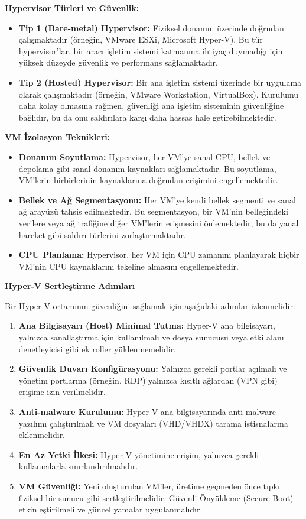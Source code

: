 \textbf{Hypervisor Türleri ve Güvenlik:}
\begin{itemize}
    \item \textbf{Tip 1 (Bare-metal) Hypervisor:} Fiziksel donanım üzerinde doğrudan çalışmaktadır (örneğin, VMware ESXi, Microsoft Hyper-V). Bu tür hypervisor'lar, bir aracı işletim sistemi katmanına ihtiyaç duymadığı için yüksek düzeyde güvenlik ve performans sağlamaktadır.
    \item \textbf{Tip 2 (Hosted) Hypervisor:} Bir ana işletim sistemi üzerinde bir uygulama olarak çalışmaktadır (örneğin, VMware Workstation, VirtualBox). Kurulumu daha kolay olmasına rağmen, güvenliği ana işletim sisteminin güvenliğine bağlıdır, bu da onu saldırılara karşı daha hassas hale getirebilmektedir.
\end{itemize}

\textbf{VM İzolasyon Teknikleri:}
\begin{itemize}
    \item \textbf{Donanım Soyutlama:} Hypervisor, her VM'ye sanal CPU, bellek ve depolama gibi sanal donanım kaynakları sağlamaktadır. Bu soyutlama, VM'lerin birbirlerinin kaynaklarına doğrudan erişimini engellemektedir.
    \item \textbf{Bellek ve Ağ Segmentasyonu:} Her VM'ye kendi bellek segmenti ve sanal ağ arayüzü tahsis edilmektedir. Bu segmentasyon, bir VM'nin belleğindeki verilere veya ağ trafiğine diğer VM'lerin erişmesini önlemektedir, bu da yanal hareket gibi saldırı türlerini zorlaştırmaktadır.
    \item \textbf{CPU Planlama:} Hypervisor, her VM için CPU zamanını planlayarak hiçbir VM'nin CPU kaynaklarını tekeline almasını engellemektedir.
\end{itemize}

\textbf{Hyper-V Sertleştirme Adımları}

Bir Hyper-V ortamının güvenliğini sağlamak için aşağıdaki adımlar izlenmelidir:

\begin{enumerate}
    \item \textbf{Ana Bilgisayarı (Host) Minimal Tutma:} Hyper-V ana bilgisayarı, yalnızca sanallaştırma için kullanılmalı ve dosya sunucusu veya etki alanı denetleyicisi gibi ek roller yüklenmemelidir.
    \item \textbf{Güvenlik Duvarı Konfigürasyonu:} Yalnızca gerekli portlar açılmalı ve yönetim portlarına (örneğin, RDP) yalnızca kısıtlı ağlardan (VPN gibi) erişime izin verilmelidir.
    \item \textbf{Anti-malware Kurulumu:} Hyper-V ana bilgisayarında anti-malware yazılımı çalıştırılmalı ve VM dosyaları (VHD/VHDX) tarama istisnalarına eklenmelidir.
    \item \textbf{En Az Yetki İlkesi:} Hyper-V yönetimine erişim, yalnızca gerekli kullanıcılarla sınırlandırılmalıdır.
    \item \textbf{VM Güvenliği:} Yeni oluşturulan VM'ler, üretime geçmeden önce tıpkı fiziksel bir sunucu gibi sertleştirilmelidir. Güvenli Önyükleme (Secure Boot) etkinleştirilmeli ve güncel yamalar uygulanmalıdır.
\end{enumerate}

